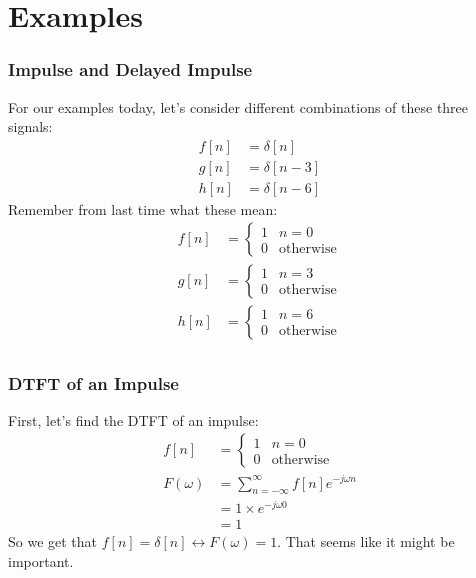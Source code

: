 \documentclass{beamer}
\begin{document}
\section[Examples]{Examples}
\setcounter{subsection}{1}

\begin{frame}
  \frametitle{Impulse and Delayed Impulse}

  For our  examples today, let's consider different combinations of these three signals:
  \begin{align*}
    f[n] &= \delta[n]\\
    g[n] &= \delta[n-3]\\
    h[n] &= \delta[n-6]
  \end{align*}
  Remember from last time what these mean:
  \begin{align*}
    f[n] &= \begin{cases}1&n=0\\0&\mbox{otherwise}\end{cases}\\
    g[n] &= \begin{cases}1&n=3\\0&\mbox{otherwise}\end{cases}\\
    h[n] &= \begin{cases}1&n=6\\0&\mbox{otherwise}\end{cases}\\
  \end{align*}
\end{frame}

\begin{frame}
  \frametitle{DTFT of an Impulse}

  First, let's find the DTFT of an impulse:
  \begin{align*}
    f[n] &= \begin{cases}1&n=0\\0&\mbox{otherwise}\end{cases}\\
    F(\omega) &= \sum_{n=-\infty}^\infty f[n]e^{-j\omega n}\\
    &= 1\times e^{-j\omega 0}\\
    &= 1
  \end{align*}
  So we get that $f[n]=\delta[n]\leftrightarrow F(\omega)=1$.  That
  seems like it might be important.
\end{frame}
\end{document}
